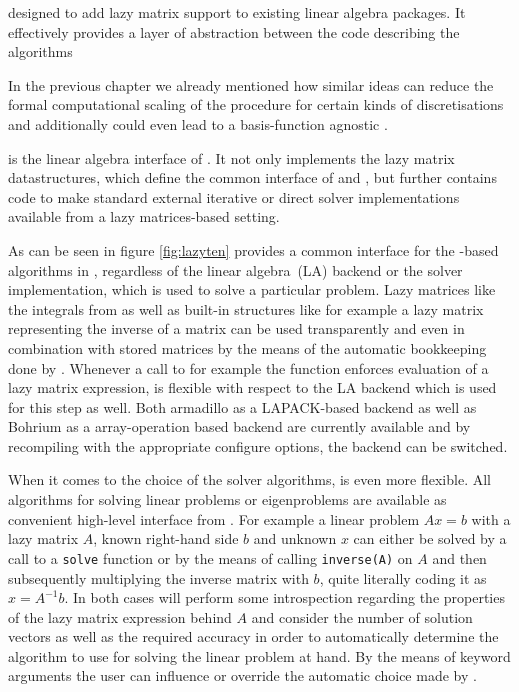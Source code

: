 designed to add lazy matrix support to existing
linear algebra packages.
It effectively provides a layer of abstraction between the code
describing the algorithms


In the previous chapter we already mentioned
how similar ideas can reduce the formal
computational scaling of the \SCF procedure
for certain kinds of discretisations
and additionally could even lead to a basis-function
agnostic \SCF.



\lazyten is the linear algebra interface of \molsturm.
It not only implements the lazy matrix datastructures,
which define the common interface of \gint and \gscf,
but further contains code to make standard external
iterative or direct solver implementations available
from a lazy matrices-based setting.

As can be seen in figure \ref{fig:lazyten} \lazyten provides
a common interface for the \contraction-based algorithms in \gscf,
regardless of the linear algebra~(LA) backend or the solver implementation,
which is used to solve a particular problem.
Lazy matrices like the integrals from \gint as well as built-in structures
like for example a lazy matrix representing the inverse of a matrix
can be used transparently and even in combination with stored matrices
by the means of the automatic bookkeeping done by \lazyten.
Whenever a call to for example the \contraction function enforces
evaluation of a lazy matrix expression,
\lazyten is flexible with respect to the LA backend which is used for
this step as well.
Both armadillo as a LAPACK-based backend as well as Bohrium as a array-operation based backend
are currently available and by recompiling \molsturm with the appropriate configure options,
the backend can be switched.

When it comes to the choice of the solver algorithms, \lazyten is even more flexible.
All algorithms for solving linear problems or eigenproblems are available as 
convenient high-level interface from \gscf.
For example a linear problem $A x = b$ with a lazy matrix $A$, known right-hand side $b$
and unknown $x$ can either be solved by a call to a \texttt{solve} function or by
the means of calling \texttt{inverse(A)} on $A$ and then subsequently
multiplying the inverse matrix with $b$, quite literally coding it as $x = A^{-1} b$.
In both cases \lazyten will perform some introspection regarding the properties of
the lazy matrix expression behind $A$ and consider the number of solution
vectors as well as the required accuracy in order to automatically determine the algorithm to use
for solving the linear problem at hand.
By the means of keyword arguments the user can influence or override the automatic
choice made by \lazyten.

